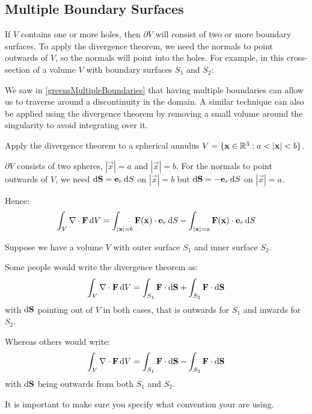 \documentclass[../main.tex]{subfiles}
\begin{document}
\subsection{Multiple Boundary Surfaces}
If $V$ contains one or more holes, then $\partial V$ will consist of two or more boundary surfaces.
To apply the divergence theorem, we need the normals to point outwards of $V$, so the normals will point into the holes.
For example, in this cross-section of a volume $V$ with boundary surfaces $S_1$ and $S_2$:
\begin{center}
\end{center}
We saw in \cref{greensMultipleBoundaries} that having multiple boundaries can allow us to traverse around a discontinuity in the domain.
A similar technique can also be applied using the divergence theorem by removing a small volume around the singularity to avoid integrating over it.
\begin{example}
  Apply the divergence theorem to a spherical annulus $V = \{\mathbf{\bm{x}} \in \mathbb{R}^3: a < |\mathbf{\bm{x}}| < b\}$.

  $\partial V$ consists of two spheres, $|\vec{x}| = a$ and $|\vec{x}| = b$.
  For the normals to point outwards of $V$, we need $\d{\vec{S}} = \vec{e}_r \d{S}$ on $|\vec{x}| = b$ but $\d{\vec{S}} = -\vec{e}_r \d{S}$ on $|\vec{x}| = a$.

  Hence:
  \[
    \int_{V} \nabla \cdot \vec{F} \d{V} = \int_{|\vec{\vec{x}}| = b} \vec{F}(\vec{x}) \cdot \vec{e}_r \d{S} - \int_{|\vec{x}| = a} \vec{F}(\vec{x}) \cdot \vec{e}_r \d{S}
  \]
\end{example}
\begin{remark}[Warning]
  Suppose we have a volume $V$ with outer surface $S_1$ and inner surface $S_2$.

  Some people would write the divergence theorem as:
  \[
    \int_{V} \nabla \cdot \vec{F} \d{V} = \int_{S_1} \vec{F}\cdot \d{\vec{S}} + \int_{S_2} \vec{F} \cdot \d{\vec{S}}
  \]
  with $\d{\vec{S}}$ pointing out of $V$ in both cases, that is outwards for $S_1$ and inwards for $S_2$.

  Whereas others would write:
  \[
    \int_{V} \nabla \cdot \vec{F} \d{V} = \int_{S_1} \vec{F} \cdot \d{\vec{S}} - \int_{S_2} \vec{F} \cdot \d{\vec{S}}
  \]
  with $\d{\vec{S}}$ being outwards from both $S_1$ and $S_2$.

  It is important to make sure you specify what convention your are using.
\end{remark}
\end{document}

